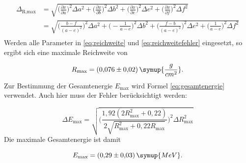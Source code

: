 \begin{equation}
\begin{aligned}
\Delta_{\text{R,max}} &= \sqrt{\biggl(\frac{\partial x}{\partial a}\biggr)^2 \Delta a^2 + \biggl(\frac{\partial x}{\partial b}\biggr)^2 \Delta b^2 + \biggl(\frac{\partial x}{\partial e}\biggr)^2 \Delta e^2 + \biggl(\frac{\partial x}{\partial f}\biggr)^2 \Delta f^2} \\
                      &= \sqrt{\biggl(\frac{b-f}{(a-e)^2}\biggr)^2 \Delta a^2 + \biggl(-\frac{1}{a-e}\biggr)^2 \Delta b^2 + \biggl(\frac{f - b}{(a - e)^2}\biggr)^2 \Delta e^2 + \biggl(\frac{1}{a - e}\biggr)^2 \Delta f^2} \\
\label{eq:reichweitefehler}
\end{aligned}
\end{equation}
Werden alle Parameter in \ref{eq:reichweite} und \ref{eq:reichweitefehler} eingesetzt, so ergibt sich eine maximale Reichweite von

\begin{equation*}
R_{\text{max}} = (0{,}076 \pm 0{,}02)\,\symup{\frac{g}{cm^2}}.
\end{equation*}
Zur Bestimmung der Gesamtenergie $E_{\text{max}}$ wird Formel \ref{eq:gesamtenergie} verwendet. Auch hier muss der Fehler berücksichtigt werden:

\begin{equation*}
\Delta E_{\text{max}} = \sqrt{\Biggl(\frac{1{,}92(2R_{\text{max}}^2+0{,}22)}{2\sqrt{R_{\text{max}}^2+0{,}22R_{\text{max}}}}\Biggr)^2 \Delta R_{\text{max}}^2 }
\end{equation*}
Die maximale Gesamtenergie ist damit

\begin{equation*}
E_{\text{max}} = (0{,}29 \pm 0{,}03)\,\symup{MeV}.
\end{equation*}